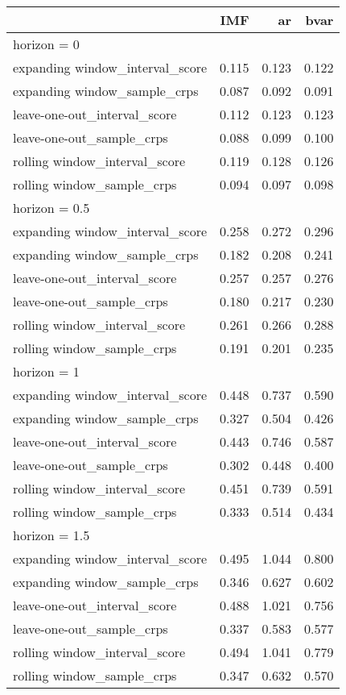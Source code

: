 \documentclass[
]{article}
\begin{document}
\newpage
\begin{longtable}{l|rrr}
\toprule
\multicolumn{1}{l}{} & IMF & ar & bvar \\ 
\midrule
\multicolumn{4}{l}{horizon = 0} \\ 
\midrule
expanding window\_interval\_score & 0.115 & 0.123 & 0.122 \\ 
expanding window\_sample\_crps & 0.087 & 0.092 & 0.091 \\ 
leave-one-out\_interval\_score & 0.112 & 0.123 & 0.123 \\ 
leave-one-out\_sample\_crps & 0.088 & 0.099 & 0.100 \\ 
rolling window\_interval\_score & 0.119 & 0.128 & 0.126 \\ 
rolling window\_sample\_crps & 0.094 & 0.097 & 0.098 \\ 
\midrule
\multicolumn{4}{l}{horizon = 0.5} \\ 
\midrule
expanding window\_interval\_score & 0.258 & 0.272 & 0.296 \\ 
expanding window\_sample\_crps & 0.182 & 0.208 & 0.241 \\ 
leave-one-out\_interval\_score & 0.257 & 0.257 & 0.276 \\ 
leave-one-out\_sample\_crps & 0.180 & 0.217 & 0.230 \\ 
rolling window\_interval\_score & 0.261 & 0.266 & 0.288 \\ 
rolling window\_sample\_crps & 0.191 & 0.201 & 0.235 \\ 
\midrule
\multicolumn{4}{l}{horizon = 1} \\ 
\midrule
expanding window\_interval\_score & 0.448 & 0.737 & 0.590 \\ 
expanding window\_sample\_crps & 0.327 & 0.504 & 0.426 \\ 
leave-one-out\_interval\_score & 0.443 & 0.746 & 0.587 \\ 
leave-one-out\_sample\_crps & 0.302 & 0.448 & 0.400 \\ 
rolling window\_interval\_score & 0.451 & 0.739 & 0.591 \\ 
rolling window\_sample\_crps & 0.333 & 0.514 & 0.434 \\ 
\midrule
\multicolumn{4}{l}{horizon = 1.5} \\ 
\midrule
expanding window\_interval\_score & 0.495 & 1.044 & 0.800 \\ 
expanding window\_sample\_crps & 0.346 & 0.627 & 0.602 \\ 
leave-one-out\_interval\_score & 0.488 & 1.021 & 0.756 \\ 
leave-one-out\_sample\_crps & 0.337 & 0.583 & 0.577 \\ 
rolling window\_interval\_score & 0.494 & 1.041 & 0.779 \\ 
rolling window\_sample\_crps & 0.347 & 0.632 & 0.570 \\ 
\bottomrule
\end{longtable}
\end{document}
